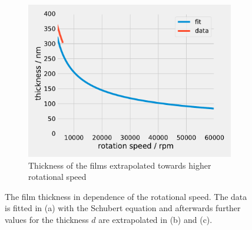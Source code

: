 \begin{figure}[ht]
    \begin{subfigure}[b]{0.5\textwidth}
        \centering
        \includegraphics[width = \textwidth]{Programmien/RotFit5000to10000.pdf}
        \caption{Thickness of the films extrapolated towards higher rotational speed}
    \end{subfigure}  

    \caption{The film thickness in dependence of the rotational speed. The data is fitted in (a) with the Schubert equation and afterwards further values for the thickness $d$ are extrapolated in (b) and (c).}
\end{figure}




